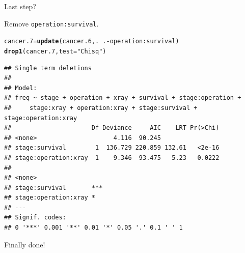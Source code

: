 \documentclass[unknownkeysallowed]{beamer}\usepackage[]{graphicx}\usepackage[]{color}
\makeatletter
\newcommand{\hlstr}[1]{\textcolor[rgb]{0.192,0.494,0.8}{#1}}%
\newcommand{\hlopt}[1]{\textcolor[rgb]{0,0,0}{#1}}%
\newcommand{\hlstd}[1]{\textcolor[rgb]{0.345,0.345,0.345}{#1}}%
\newcommand{\hlkwb}[1]{\textcolor[rgb]{0.69,0.353,0.396}{#1}}%
\newcommand{\hlkwc}[1]{\textcolor[rgb]{0.333,0.667,0.333}{#1}}%
\newcommand{\hlkwd}[1]{\textcolor[rgb]{0.737,0.353,0.396}{\textbf{#1}}}%
\newenvironment{kframe}{%
 \def\at@end@of@kframe{}%
 \ifinner\ifhmode%
  \def\at@end@of@kframe{\end{minipage}}%
  \begin{minipage}{\columnwidth}%
 \fi\fi%
 \def\FrameCommand##1{\hskip\@totalleftmargin \hskip-\fboxsep
 \colorbox{shadecolor}{##1}\hskip-\fboxsep
     \hskip-\linewidth \hskip-\@totalleftmargin \hskip\columnwidth}%
 \MakeFramed {\advance\hsize-\width
   \@totalleftmargin\z@ \linewidth\hsize
   \@setminipage}}%
 {\par\unskip\endMakeFramed%
 \at@end@of@kframe}
\newenvironment{knitrout}{}{} %
\makeatother
\begin{document}
\begin{frame}[fragile]{Last step?}
  
Remove \texttt{operation:survival}.  
  
\begin{knitrout}\footnotesize
{}\color{fgcolor}\begin{kframe}
\begin{alltt}
\hlstd{cancer.7}\hlkwb{=}\hlkwd{update}\hlstd{(cancer.6,.}\hlopt{~}\hlstd{.}\hlopt{-}\hlstd{operation}\hlopt{:}\hlstd{survival)}
\hlkwd{drop1}\hlstd{(cancer.7,}\hlkwc{test}\hlstd{=}\hlstr{"Chisq"}\hlstd{)}
\end{alltt}
\begin{verbatim}
## Single term deletions
## 
## Model:
## freq ~ stage + operation + xray + survival + stage:operation + 
##     stage:xray + operation:xray + stage:survival + stage:operation:xray
##                      Df Deviance     AIC    LRT Pr(>Chi)
## <none>                     4.116  90.245                
## stage:survival        1  136.729 220.859 132.61   <2e-16
## stage:operation:xray  1    9.346  93.475   5.23   0.0222
##                         
## <none>                  
## stage:survival       ***
## stage:operation:xray *  
## ---
## Signif. codes:  
## 0 '***' 0.001 '**' 0.01 '*' 0.05 '.' 0.1 ' ' 1
\end{verbatim}
\end{kframe}
\end{knitrout}
  
Finally done!
  
\end{frame}
\end{document}
